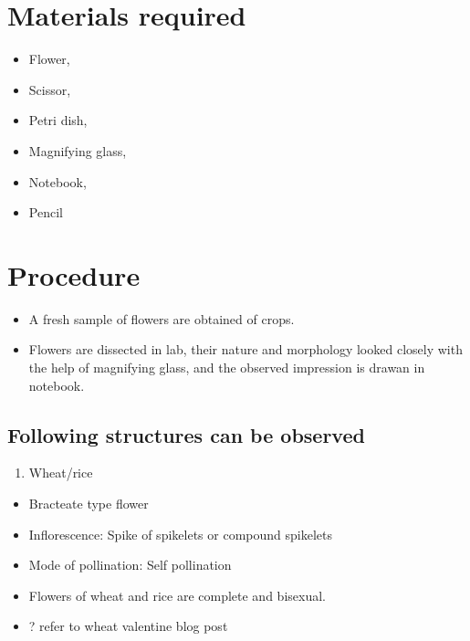 \documentclass[]{book}
\providecommand{\tightlist}{%
  \setlength{\itemsep}{0pt}\setlength{\parskip}{0pt}}
\begin{document}
\hypertarget{materials-required}{%
\section{Materials required}\label{materials-required}}

\begin{itemize}
\tightlist
\item
  Flower,
\item
  Scissor,
\item
  Petri dish,
\item
  Magnifying glass,
\item
  Notebook,
\item
  Pencil
\end{itemize}

\hypertarget{procedure}{%
\section{Procedure}\label{procedure}}

\begin{itemize}
\tightlist
\item
  A fresh sample of flowers are obtained of crops.
\item
  Flowers are dissected in lab, their nature and morphology looked closely with the help of magnifying glass, and the observed impression is drawan in notebook.
\end{itemize}

\hypertarget{following-structures-can-be-observed}{%
\subsection{Following structures can be observed}\label{following-structures-can-be-observed}}

\begin{enumerate}
\def\labelenumi{\arabic{enumi}.}
\tightlist
\item
  Wheat/rice
\end{enumerate}

\begin{itemize}
\tightlist
\item
  Bracteate type flower
\item
  Inflorescence: Spike of spikelets or compound spikelets
\item
  Mode of pollination: Self pollination
\item
  Flowers of wheat and rice are complete and bisexual.
\item
  ? refer to wheat valentine blog post
\end{itemize}
\end{document}
